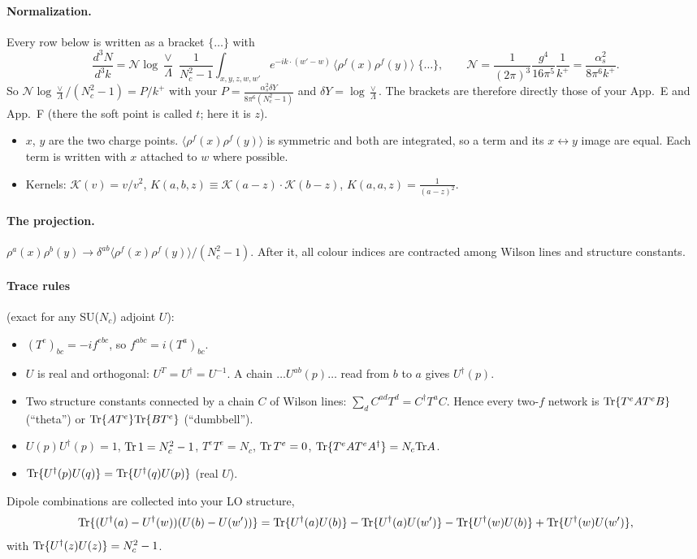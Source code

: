 \documentclass[10pt]{article}
\numberwithin{equation}{section}
\newcommand{\NN}{\mathcal N}
\newcommand{\pre}{\frac{1}{(2\pi)^3}}
\begin{document}
\paragraph{Normalization.} Every row below is written as a bracket $\{\dots\}$ with
\begin{equation}
\frac{d^3N}{d^3k}=\NN\log\frac{\vee}{\Lambda}\;\frac{1}{N_c^2-1}\int_{x,y,z,w,w'}e^{-ik\cdot(w'-w)}\,\langle\rho^f(x)\rho^f(y)\rangle\;\{\dots\},\qquad\NN=\pre\frac{g^4}{16\pi^5}\frac{1}{k^+}=\frac{\alpha_s^2}{8\pi^6k^+}.
\label{eq:norm}
\end{equation}
So $\NN\log\frac{\vee}{\Lambda}/(N_c^2-1)=P/k^+$ with your $P=\frac{\alpha_s^2\delta Y}{8\pi^6(N_c^2-1)}$ and $\delta Y=\log\frac\vee\Lambda$. The brackets are therefore directly those of your App.~E and App.~F (there the soft point is called $t$; here it is $z$).
\begin{itemize}
\item $x$, $y$ are the two charge points. $\langle\rho^f(x)\rho^f(y)\rangle$ is symmetric and both are integrated, so a term and its $x\leftrightarrow y$ image are equal. Each term is written with $x$ attached to $w$ where possible.
\item Kernels: $\mathcal K(v)=v/v^2$, $K(a,b,z)\equiv\mathcal K(a-z)\cdot\mathcal K(b-z)$, $K(a,a,z)=\frac{1}{(a-z)^2}$.
\end{itemize}
\paragraph{The projection.} $\rho^a(x)\rho^b(y)\to\delta^{ab}\langle\rho^f(x)\rho^f(y)\rangle/(N_c^2-1)$. After it, all colour indices are contracted among Wilson lines and structure constants.
\paragraph{Trace rules} (exact for any SU($N_c$) adjoint $U$):
\begin{itemize}
\item $(T^e)_{bc}=-if^{ebc}$, so $f^{abc}=i(T^a)_{bc}$.
\item $U$ is real and orthogonal: $U^T=U^\dagger=U^{-1}$. A chain $\dots U^{ab}(p)\dots$ read from $b$ to $a$ gives $U^\dagger(p)$.
\item Two structure constants connected by a chain $C$ of Wilson lines: $\sum_dC^{ad}T^d=C^\dagger T^aC$. Hence every two-$f$ network is ${\rm Tr}\{T^eAT^eB\}$ (``theta'') or ${\rm Tr}\{AT^e\}{\rm Tr}\{BT^e\}$ (``dumbbell'').
\item $U(p)U^\dagger(p)=1$, ${\rm Tr}\,1=N_c^2-1$, $T^eT^e=N_c$, ${\rm Tr}\,T^e=0$, ${\rm Tr}\{T^eAT^eA^\dagger\}=N_c{\rm Tr}A$.
\item ${\rm Tr}\{U^\dagger(p)U(q)\}={\rm Tr}\{U^\dagger(q)U(p)\}$ (real $U$).
\end{itemize}
Dipole combinations are collected into your LO structure,
\begin{equation*}
{\rm Tr}\{(U^\dagger(a)-U^\dagger(w))(U(b)-U(w'))\}={\rm Tr}\{U^\dagger(a)U(b)\}-{\rm Tr}\{U^\dagger(a)U(w')\}-{\rm Tr}\{U^\dagger(w)U(b)\}+{\rm Tr}\{U^\dagger(w)U(w')\},
\end{equation*}
with ${\rm Tr}\{U^\dagger(z)U(z)\}=N_c^2-1$.
\end{document}
